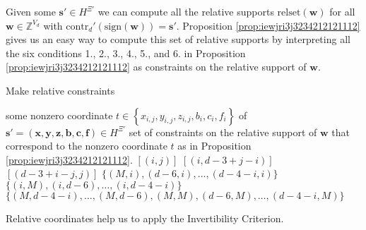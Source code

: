 \begin{remark}
    Given some \( \mathbf{s}' \in {H}^{\Xi'} \) we can compute all the relative supports \( \mathrm{relset}(\mathbf{w}) \) for all \( \mathbf{w} \in \mathbb{Z}^{V_d} \) with \( \mathrm{contr}_d'(\mathrm{sign}(\mathbf{w})) = \mathbf{s}'\). Proposition \ref{prop:iewjri3j3234212121112} gives us an easy way to compute this set of relative supports by interpreting all the six conditions 1., 2., 3., 4., 5., and 6. in Proposition \ref{prop:iewjri3j3234212121112} as constraints on the relative support of \( \mathbf{w} \). 


\begin{algorithm}
    \caption{Make relative constraints}
    \label{alg:make_rel_constraints}
    \begin{algorithmic}[1]
    \Require some nonzero coordinate \( t \in \left\{ x_{i,j}, y_{i,j}, z_{i,j}, b_i, c_i, f_i \right\} \) of $\mathbf{s}' = (\mathbf{x},\mathbf{y},\mathbf{z},\mathbf{b},\mathbf{c},\mathbf{f} ) \in H^{\Xi'}$
    \Ensure set of constraints on the relative support of \( \mathbf{w} \) that correspond to the nonzero coordinate \( t \) as in Proposition \ref{prop:iewjri3j3234212121112}.
    \State \Return $[(i,j)]$
\EndIf
{}
    \State \Return $[(i, d-3+j-i)]$
\EndIf
{}
    \State \Return $[(d-3+i-j, j)]$
\EndIf
{}
    \State \Return $\{(M,i), (d-6,i), \dots, (d-4-i,i)\}$
\EndIf
{}
    \State \Return $\{(i,M), (i,d-6), \dots, (i,d-4-i)\}$
\EndIf
{}
    \State \Return $\{(M, d-4-i), \dots, (M,d-6), (M,M), (d-6,M), \dots, (d-4-i,M)\}$
\EndIf    \EndFunction
    \end{algorithmic}
    \end{algorithm}
\end{remark}

Relative coordinates help us to apply the Invertibility Criterion. 

